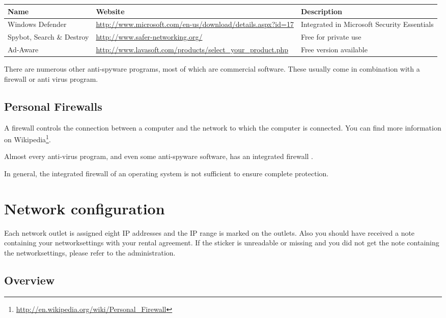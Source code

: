 \documentclass[a4paper,12pt]{scrartcl}
\begin{document}
\begin{center}
  \begin{tabularx}{\linewidth}{|p{.18\linewidth}Xp{.3\linewidth}|}
    \hline
    Name & Website & Description\\
    \hline \hline
    Windows Defender & \url{http://www.microsoft.com/en-us/download/details.aspx?id=17} & Integrated in Microsoft Security Essentials\\
    \hline
    Spybot, Search \& Destroy & \url{http://www.safer-networking.org/} & Free for private use\\
    \hline
    Ad-Aware & \url{http://www.lavasoft.com/products/select\_your\_product.php} & Free version available\\
    \hline
  \end{tabularx}
\end{center}

There are numerous other anti-spyware programs, most of which are commercial software. These usually come in combination with a firewall or anti virus program.

\subsection*{Personal Firewalls}

A firewall controls the connection between a computer and the network to which the computer is connected. You can find more information on Wikipedia\footnote{\url{http://en.wikipedia.org/wiki/Personal\_Firewall}}.

Almost every anti-virus program, and even some anti-spyware software, has an integrated firewall .

In general, the integrated firewall of an operating system is not sufficient to ensure complete protection.
\newpage

\section*{Network configuration}

Each network outlet is assigned eight IP addresses and the IP range is marked on the outlets. Also you should have received a note containing your networksettings with your rental agreement. If the sticker is unreadable or missing and you did not get the note containing the networksettings, please refer to the administration.

\subsection*{Overview}
\end{document}
